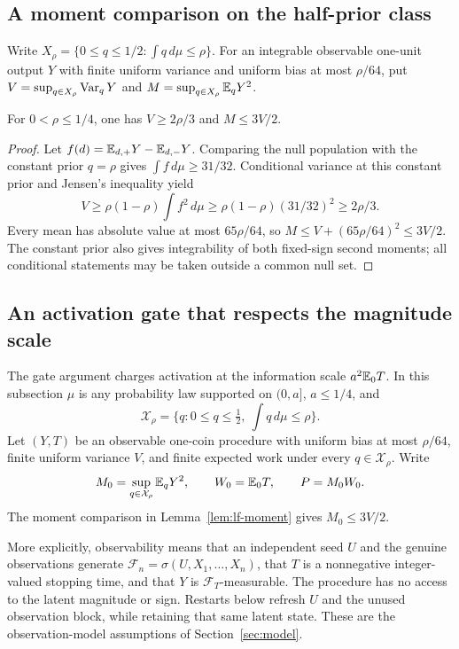 \subsection{A moment comparison on the half-prior class}

Write $X_\rho=\{0\le q\le1/2:\int q\,d\mu\le\rho\}$.
For an integrable observable one-unit output $Y$ with finite uniform
variance and uniform bias at most $\rho/64$, put $V=\sup_{q\in X_\rho}\operatorname{Var}_qY$ and
$M=\sup_{q\in X_\rho}\mathbb E_qY^2$.

\begin{lemma}\label{lem:lf-moment}
For $0<\rho\le1/4$, one has $V\ge2\rho/3$ and $M\le3V/2$.
\end{lemma}
\begin{proof}
Let $f(d)=\mathbb E_{d,+}Y-\mathbb E_{d,-}Y$. Comparing the null population with
the constant prior $q=\rho$ gives $\int f\,d\mu\ge31/32$.
Conditional variance at this constant prior and Jensen's inequality yield
\[
 V\ge\rho(1-\rho)\int f^2\,d\mu
 \ge\rho(1-\rho)(31/32)^2\ge2\rho/3.
\]
Every mean has absolute value at most $65\rho/64$, so
$M\le V+(65\rho/64)^2\le3V/2$.
The constant prior also gives integrability of both fixed-sign second
moments; all conditional statements may be taken outside a common null set.
\end{proof}

\subsection{An activation gate that respects the magnitude scale}

The gate argument charges activation at the information
scale \(a^2\mathbb E_0T\).  In this subsection \(\mu\) is any probability law
supported on \((0,a]\), \(a\le1/4\), and
\[
 \mathcal X_\rho=
 \{q:0\le q\le\tfrac12,\ \textstyle\int q\,d\mu\le\rho\}.
\]
Let \((Y,T)\) be an observable one-coin procedure with uniform bias at
most \(\rho/64\), finite uniform variance \(V\), and finite expected work
under every \(q\in\mathcal X_\rho\).  Write
\[
 M_0=\sup_{q\in\mathcal X_\rho}\mathbb E_qY^2,\qquad
 W_0=\mathbb E_0T,\qquad P=M_0W_0.
\]
The moment comparison in Lemma~\ref{lem:lf-moment} gives
\(M_0\le3V/2\).

More explicitly, observability means that an independent seed $U$ and
the genuine observations generate $\mathcal F_n=\sigma(U,X_1,\ldots,X_n)$,
that $T$ is a nonnegative integer-valued stopping time, and that $Y$ is
$\mathcal F_T$-measurable. The procedure has no access to the latent
magnitude or sign. Restarts below refresh $U$ and the unused observation
block, while retaining that same latent state. These are the observation-model assumptions of
Section~\ref{sec:model}.


